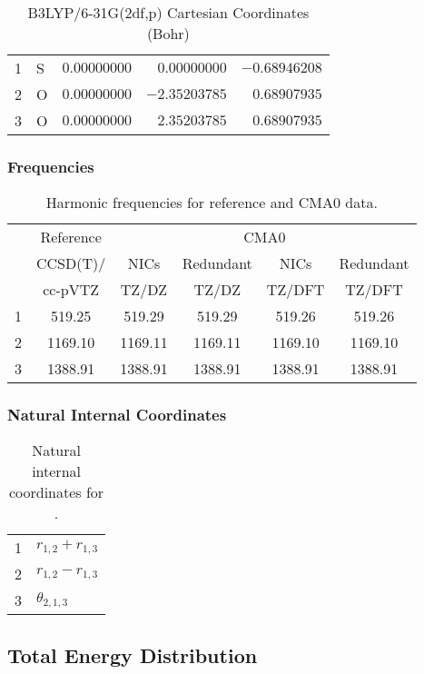 \documentclass[10pt,oneside]{article}
\begin{document}
\begin{table}[h]
\centering
\caption{B3LYP/6-31G(2df,p) Cartesian Coordinates (Bohr)}
\begin{tabular}{llrrr}
\toprule
1  & S  & $ 0.00000000$ & $ 0.00000000$ & $-0.68946208$ \\
2  & O  & $ 0.00000000$ & $-2.35203785$ & $ 0.68907935$ \\
3  & O  & $ 0.00000000$ & $ 2.35203785$ & $ 0.68907935$ \\
\bottomrule
\end{tabular}
\end{table}

\begin{table}[h!]
\subsubsection*{Frequencies}
\centering
\caption{Harmonic frequencies for reference and CMA0 data.}
\begin{tabular}{cccccc}
\toprule
{} & Reference & \multicolumn{4}{c}{CMA0} \\
{} &  CCSD(T)/ &    NICs &  Redundant &    NICs & Redundant \\
{} &   cc-pVTZ &   TZ/DZ &      TZ/DZ &  TZ/DFT &    TZ/DFT \\
\midrule
1 &    519.25 &  519.29 &     519.29 &  519.26 &    519.26 \\
2 &   1169.10 & 1169.11 &    1169.11 & 1169.10 &   1169.10 \\
3 &   1388.91 & 1388.91 &    1388.91 & 1388.91 &   1388.91 \\
\bottomrule
\end{tabular}
\end{table}

\begin{table}[h!]
\subsubsection*{Natural Internal Coordinates}
\centering
\caption{Natural internal coordinates for .}
\small
\begin{tabular}{ll}
\toprule
  1   & $r_{1,2} + r_{1,3}$ \\
  2   & $r_{1,2} - r_{1,3}$ \\
  3   & $\theta_{2,1,3}$ \\
\bottomrule
\end{tabular}
\end{table}

\begin{table}
\subsection*{Total Energy Distribution}
\centering\end{table}
\end{document}
